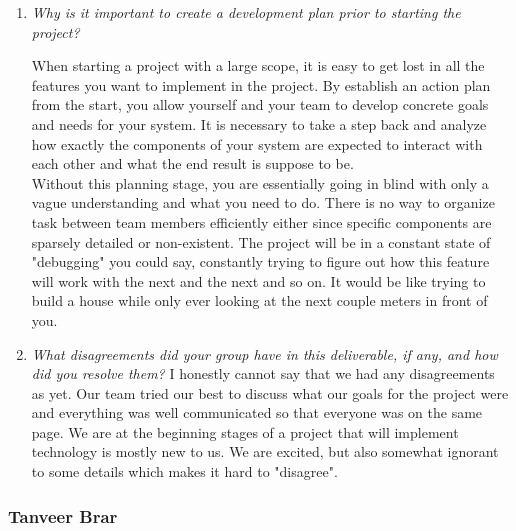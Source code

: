 \documentclass{article}
\begin{document}
\begin{enumerate}

  \item \textit{Why is it important to create a development plan prior to starting the project?}

    When starting a project with a large scope, it is easy to get lost in all the features you want to implement in the project. 
    By establish an action plan from the start, you allow yourself and your team to develop concrete goals and needs for your system. 
    It is necessary to take a step back and analyze how exactly the components of your system are expected to interact with each other 
    and what the end result is suppose to be.\\

    Without this planning stage, you are essentially going in blind with only a vague understanding and what you need to do. There is 
    no way to organize task between team members efficiently either since specific components are sparsely detailed or non-existent. The 
    project will be in a constant state of "debugging" you could say, constantly trying to figure out how this feature will work with the 
    next and the next and so on. It would be like trying to build a house while only ever looking at the next couple meters in front of you.

  \item \textit{What disagreements did your group have in this deliverable, if any, and how did you resolve them?}
  I honestly cannot say that we had any disagreements as yet. Our team tried our best to discuss what our goals for the project were and 
  everything was well communicated so that everyone was on the same page. We are at the beginning stages of a project that will implement 
  technology is mostly new to us. We are excited, but also somewhat ignorant to some details which makes it hard to "disagree".

\end{enumerate}

\subsubsection*{Tanveer Brar}
\end{document}

